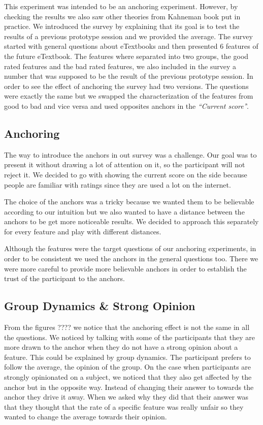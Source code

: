 \documentclass[Main.tex]{subfiles}
\begin{document}
This experiment was intended to be an anchoring experiment. However, by checking the results we also saw other theories from Kahneman book  put in practice. We introduced the survey by explaining that its goal is to test the results of a previous prototype session and we provided the average. The survey started with general questions about eTextbooks and then presented 6 features of the future eTextbook. The features where separated into two groups, the good rated features and the bad rated features, we also included in the survey a number that was supposed to be the result of the previous prototype session. In order to see the effect of anchoring the survey had two versions. The questions were exactly the same but we swapped the characterization of the features from good to bad and vice versa and used opposites anchors in the {\it ``Current score'}'.

\subsection{Anchoring}
The way to introduce the anchors in out survey was a challenge. Our goal was to present it without drawing a lot of attention on it, so the participant will not reject it. We decided to go with showing the current score on the side because people are familiar with ratings since they are used a lot on the internet.

The choice of the anchors was a tricky because we wanted them to be believable according to our intuition but we also wanted to have a distance between the anchors to be get more noticeable results. We decided to approach this separately for every feature and play with different distances.

Although the features were the target questions of our anchoring experiments, in order to be consistent we used the anchors in the general questions too. There we were more careful to provide more believable anchors in order to establish the trust of the participant to the anchors.


\subsection{Group Dynamics \& Strong Opinion}
From the figures ???? we notice that the anchoring effect is not the same in all the questions. We noticed by talking with some of the participants that they are more drawn to the anchor when they do not have a strong opinion about a feature. This could be explained by group dynamics. The participant prefers to follow the average, the opinion of the group. On the case when  participants are strongly opinionated on a subject, we noticed that they also get affected by the anchor but in the opposite way. Instead of changing their answer to towards the anchor they drive it away. When we asked why they did that their answer was that they thought that the rate of a specific feature was really unfair so they wanted to change the average towards their opinion. 
\end{document}
